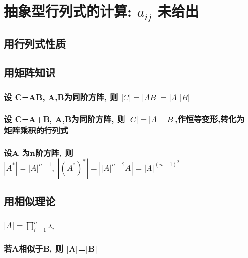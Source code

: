 \documentclass[UTF8]{ctexart}
\begin{document}
	
	\section{抽象型行列式的计算: $a_{ij}$ 未给出	}
	
		\subsection{用行列式性质}
		
		\subsection{用矩阵知识}
		
			\subsubsection{设 C=AB, A,B为同阶方阵, 则 $|C|=|AB|=|A||B|$}
			
			\subsubsection{设 C=A+B, A,B为同阶方阵, 则 $|C|=|A+B|$,作恒等变形,转化为矩阵乘积的行列式 }
			
			\subsubsection{设A 为n阶方阵, 则 $|A^*|=|A|^{n-1},\ |(A^*)^*|=\left| \left| A \right|^{n-2}A \right|=\left| A \right|^{\left( n-1 \right) ^2}	$}
		
		\subsection{用相似理论}
		
			\subsubsection{$\left| A \right|=\prod_{i=1}^n{\lambda _i}$}
			
			\subsubsection{若A相似于B, 则 |A|=|B|}
	
	
	
\end{document}
